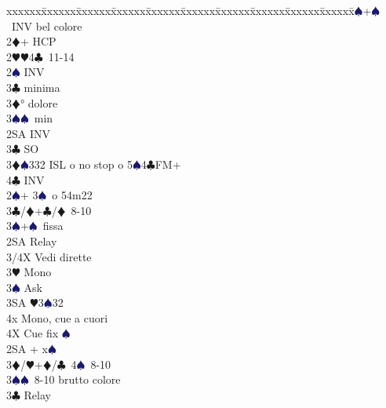 \documentclass[a4paper,italian]{article}
\newcommand{\BC}{\textcolor{OliveGreen}{$\clubsuit$}}
\newcommand{\BD}{\textcolor{RedOrange}{$\vardiamondsuit$}}
\newcommand{\BH}{\textcolor{Red2}{$\varheartsuit${}}}
\newcommand{\BS}{\textcolor{MidnightBlue}{$\spadesuit${}}}
\newenvironment{bidtable}
{\begin{tabbing}

    xxxxxx\=xxxxxx\=xxxxxx\=xxxxxx\=xxxxxx\=xxxxxx\=xxxxxx\=xxxxxx\=xxxxxx\=xxxxxx\=\kill}
{\end{tabbing} }%
\begin{document}
\begin{multicols*}{2}
\begin{bidtable}
                                            3\BS {}+\BS\ INV bel colore\\
                                            2\BD {}+ HCP\+\\
                                            2\BH {}\BH 4\BC\ 11-14\+\\
                                            2\BS \> INV\+\\
                                            3\BC {} minima\\
                                            3\BD {}° dolore\\
                                            3\BS {}\BS\ min\-\\
                                            2SA \> INV\\
                                            3\BC \> SO\\
                                            3\BD {}\BS 332 ISL o no stop o 5\BS 4\BC FM+\\
                                            4\BC \> INV\-\\
                                            2\BS {}+ 3\BS\ o 54m22\+\\
                                            3\BC/\BD {}+\BC /\BD\ 8-10\\
                                            3\BS {}+\BS\ fissa\\
                                            2SA \> Relay\+\\
                                            3/4X \> Vedi dirette\\
                                            3\BH \> Mono\+\\
                                            3\BS \> Ask\+\\
                                            3SA \BH 3\BS 32\\
                                            4x \> Mono, cue a cuori\-\\
                                            4X \> Cue fix \BS \-\-\-\\
                                            2SA + x\BS \+\\
                                            3\BD/\BH {}+\BD /\BC\ 4\BS\ 8-10\\
                                            3\BS {}\BS\ 8-10 brutto colore\\
                                            3\BC \> Relay\+\\

\end{bidtable}
\end{multicols*}
\end{document}
